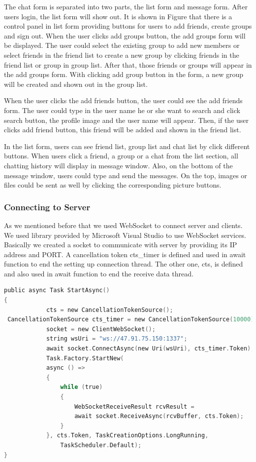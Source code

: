\documentclass[a4paper,11pt]{article}
\begin{document}
The chat form is separated into two parts, the list form and message form. After users login, the list form will show out. It is shown in Figure that there is a control panel in list form providing buttons for users to add friends, create groups and sign out. When the user clicks add groups button, the add groups form will be displayed. The user could select the existing group to add new members or select friends in the friend list to create a new group by clicking friends in the friend list or group in group list. After that, those friends or groups will appear in the add groups form. With clicking add group button in the form, a new group will be created and shown out in the group list. 

When the user clicks the add friends button, the user could see the add friends form. The user could type in the user name he or she want to search and click search button, the profile image and the user name will appear. Then, if the user clicks add friend button, this friend will be added and shown in the friend list.

In the list form, users can see friend list, group list and chat list by click different buttons. When users click a friend, a group or a chat from the list section, all chatting history will display in message window. Also, on the bottom of the message window, users could type and send the messages. On the top, images or files could be sent as well by clicking the corresponding picture buttons. 

\subsubsection{Connecting to Server}

As we mentioned before that we used WebSocket to connect server and clients. We used library provided by Microsoft Visual Studio to use WebSocket services. Basically we created a socket to communicate with server by providing its IP address and PORT. A cancellation token cts\_timer is defined and used in await function to end the setting up connection thread. The other one, cts, is defined and also used in await function to end the receive data thread.


\begin{lstlisting}[language=C]
public async Task StartAsync()
{
            cts = new CancellationTokenSource();
 CancellationTokenSource cts_timer = new CancellationTokenSource(10000);
            socket = new ClientWebSocket();
            string wsUri = "ws://47.91.75.150:1337";
            await socket.ConnectAsync(new Uri(wsUri), cts_timer.Token);
            Task.Factory.StartNew(
            async () =>
            {
                while (true)
                {
                    WebSocketReceiveResult rcvResult =
                    await socket.ReceiveAsync(rcvBuffer, cts.Token);
                }
            }, cts.Token, TaskCreationOptions.LongRunning,
                TaskScheduler.Default);
}
\end{lstlisting}
\end{document}
